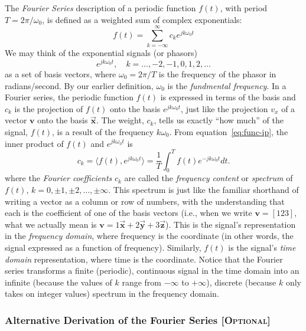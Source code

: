 The \emph{Fourier Series} description of a periodic function $f(t)$, 
with period $T=2\pi/\omega_0$, is defined
as a weighted sum of complex exponentials:
\begin{equation}
f(t) = \sum_{k=-\infty}^{\infty} c_k e^{jk\omega_0 t}
\label{eq:fs}
\end{equation}
We may think of the exponential signals (or phasors)
\begin{equation}
e^{jk\omega_0 t}, \quad k = \ldots, -2, -1, 0, 1, 2, \ldots
\end{equation}
as a set of basis vectors, where $\omega_0 = 2\pi /T$ is the frequency of
the phasor in radians/second. By our earlier definition, $\omega_0$ is the
\emph{fundmental frequency}. In a Fourier series, the periodic
function $f(t)$ is expressed in terms of the basis and $c_k$ is the
projection of $f(t)$ onto the basis $e^{jk\omega_0 t}$, just like the
projection $v_x$ of a vector $\mathbf{v}$ onto the basis $\vec{\mathbf{x}}$. The weight, $c_k$, tells us exactly ``how much'' of the signal, $f(t)$, is a result of the frequency $k\omega_0$. From
equation~\ref{eq:func-ip}, the inner product of $f(t)$ and
$e^{jk\omega_0 t}$ is
\begin{equation}
c_k = \langle f(t), e^{jk\omega_0 t}\rangle 
    = \frac{1}{T}\int_0^T f(t)e^{-jk\omega_0 t}dt.
\label{eq:fs-ck}
\end{equation}
where the \emph{Fourier coefficients} $c_k$ are called the
 \emph{frequency content} or
\emph{spectrum} of $f(t)$, $k=0, \pm 1, \pm 2, \ldots,
\pm\infty$. This spectrum is just like the familiar shorthand of
writing a vector as a column or row of numbers, with the understanding
that each is the coefficient of one of the basis vectors (i.e., when
we write $\mathbf{v} = [1 2 3]$, what we actually mean is $\mathbf{v}
= 1 \vec{\mathbf{x}} + 2 \vec{\mathbf{y}} + 3 \vec{\mathbf{z}}$).
This is the signal's representation in the \emph{frequency domain},
where frequency is the coordinate (in other words, the signal
expressed as a function of frequency).  Similarly, $f(t)$ is the
signal's \emph{time domain} representation, where time is the
coordinate. Notice that the Fourier series transforms a finite
(periodic), continuous signal in the time domain into an infinite
(because the values of $k$ range from $-\infty$ to $+\infty$),
discrete (because $k$ only takes on integer values) spectrum in the
frequency domain.

\subsubsection{Alternative Derivation of the Fourier Series [\textsc{Optional}]}

